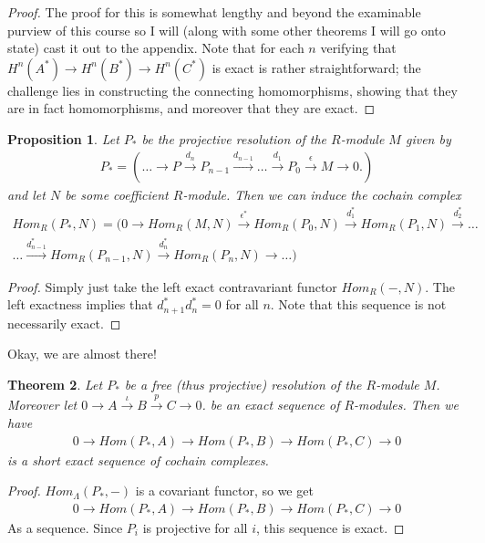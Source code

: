 \documentclass[12pt]{book}
\newtheorem{theorem}{Theorem}[chapter]
\newtheorem{proposition}[theorem]{Proposition}
\theoremstyle{definition}
\begin{document}
\begin{proof}
    The proof for this is somewhat lengthy and beyond the examinable purview of this course so I will (along with some other theorems I will go onto state) cast it out to the appendix. Note that for each $n$ verifying that  $H^n(A^*) \rightarrow H^n(B^*) \rightarrow H^n(C^*)$ is exact is rather straightforward; the challenge lies in constructing the connecting homomorphisms, showing that they are in fact homomorphisms, and moreover that they are exact.  

\end{proof}


\begin{proposition}
    Let $P_*$ be the projective resolution of the $R$-module $M$ given by 
    \begin{align*}
        P_* = (\dots \rightarrow P \xrightarrow{d_n} P_{n-1} \xrightarrow{d_{n-1}} \dots \xrightarrow{d_1} P_0 \xrightarrow{\epsilon} M \rightarrow 0.)    
    \end{align*}
    and let $N$ be some coefficient $R$-module. Then we can induce the cochain complex
    \begin{align*}
        Hom_R(P_*, N) = (0 \rightarrow Hom_R(M,N) \xrightarrow{\epsilon^*} Hom_R(P_0, N) \xrightarrow{d_1^*} Hom_R(P_1, N) \xrightarrow{d_2^*} \dots \\
        \dots \xrightarrow{d_{n-1}^*} Hom_R(P_{n-1}, N) \xrightarrow{d_n^*} Hom_R(P_n, N) \rightarrow \dots)
    \end{align*}
\end{proposition}

\begin{proof}
    Simply just take the left exact contravariant functor $Hom_R(-,N)$. The left exactness implies that $d^*_{n+1} d_n^* = 0$ for all $n$. Note that this sequence is not necessarily exact. 
\end{proof}



\noindent Okay, we are almost there!

\begin{theorem}
    Let $P_*$ be a free (thus projective) resolution of the $R$-module $M$. Moreover let $0 \rightarrow A \xrightarrow{\iota} B \xrightarrow{p} C \rightarrow 0$. 
    be an exact sequence of $R$-modules. Then we have 
    \begin{align*}
        0 \rightarrow Hom(P_*, A) \rightarrow Hom(P_*, B) \rightarrow Hom(P_*, C) \rightarrow 0
    \end{align*}
    is a short exact sequence of cochain complexes. 
\end{theorem}
\begin{proof}
    $Hom_\Lambda(P_*, -)$ is a covariant functor, so we get
    \begin{align*}
        0 \rightarrow Hom(P_*, A) \rightarrow Hom(P_*, B) \rightarrow Hom(P_*, C) \rightarrow 0
    \end{align*}
    As a sequence. Since $P_i$ is projective for all $i$, this sequence is exact. 
\end{proof}
\end{document}
